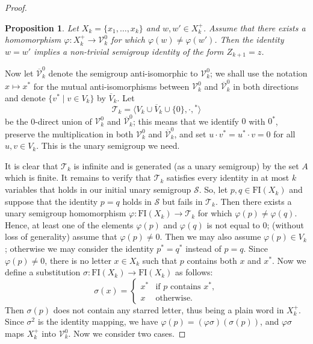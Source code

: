 \documentclass[11pt,reqno]{amsart}
\numberwithin{equation}{section}
\newtheorem{Prop}[Thm]{Proposition}
\theoremstyle{remark}
\begin{document}
\begin{proof}
\begin{Prop} {\rm\cite[Lemma 4.14]{Sapir}}
\label{avoidable identities} Let $X_k=\{x_1,\dots,x_k\}$ and
$w,w'\in X_k^+$. Assume that there exists a homomorphism
$\varphi:X_k^+\to\mathcal{V}_k^0$ for which
$\varphi(w)\ne\varphi(w')$. Then the identity $w=w'$ implies a
non-trivial semigroup identity of the form $Z_{k+1}=z$.
\end{Prop}

Now let $\overline{\mathcal{V}}_k^0$ denote the semigroup
anti-isomorphic to $\mathcal{V}_k^0$; we shall use the notation
$x\mapsto x^*$ for the mutual anti-isomorphisms between
$\mathcal{V}_k^0$ and $\overline{\mathcal{V}}_k^0$ in both
directions and denote $\{v^*\mid v\in V_k\}$ by $\overline{V}_k$.
Let
$$\mathcal{T}_k=\langle V_k\cup\overline{V}_k\cup\{0\},\cdot,{}^*\rangle$$
be the 0-direct union of $\mathcal{V}_k^0$ and
$\overline{\mathcal{V}}_k^0$; this means that we identify $0$ with
$0^*$, preserve the multiplication in both $\mathcal{V}_k^0$ and
$\overline{\mathcal{V}}_k^0$, and set $u\cdot v^*=u^*\cdot v=0$
for all $u,v\in V_k$. This is the unary semigroup we need.

It is clear that $\mathcal{T}_k$ is infinite and is generated (as
a unary semigroup) by the set $A$ which is finite. It remains to
verify that $\mathcal{T}_k$ satisfies every identity in at most
$k$ variables that holds in our initial unary semigroup
$\mathcal{S}$. So, let $p,q\in\mathrm{FI}(X_k)$ and suppose that
the identity $p=q$ holds in $\mathcal{S}$ but fails in
$\mathcal{T}_k$. Then there exists a unary semigroup homomorphism
$\varphi:\mathrm{FI}(X_k)\to\mathcal{T}_k$ for which
$\varphi(p)\ne\varphi(q)$. Hence, at least one of the elements
$\varphi(p)$ and $\varphi(q)$ is not equal to $0$; (without loss
of generality) assume that $\varphi(p)\ne 0$. Then we may also
assume $\varphi(p)\in V_k$; otherwise we may consider the identity
$p^*=q^*$ instead of $p=q$. Since $\varphi(p)\ne0$, there is no
letter $x\in X_k$ such that $p$ contains both $x$ and $x^*$. Now
we define a substitution
$\sigma:\mathrm{FI}(X_k)\to\mathrm{FI}(X_k)$ as follows:
$$\sigma(x)=\left\{\begin{array}{ll}
x^* & \text{if } p \text{ contains } x^*,\\
x & \text{otherwise}.\end{array}\right.$$ Then $\sigma(p)$ does
not contain any starred letter, thus being a plain word in
$X_k^+$. Since $\sigma^2$ is the identity mapping, we have
$\varphi(p)= (\varphi\sigma)(\sigma(p))$, and $\varphi\sigma$ maps
$X_k^+$ into $\mathcal{V}_k^0$. Now we consider two cases.


\end{proof}
\end{document}
